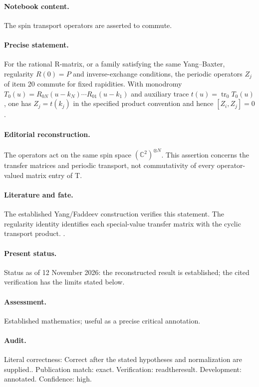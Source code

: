 \paragraph{Notebook content.} The spin transport operators are asserted to commute.

\paragraph{Precise statement.} For the rational R-matrix, or a family satisfying the same Yang--Baxter, regularity $R(0)=P$ and inverse-exchange conditions, the periodic operators $Z_j$ of item 20 commute for fixed rapidities. With monodromy $T_0(u)=R_{0N}(u-k_N)\cdots R_{01}(u-k_1)$ and auxiliary trace $t(u)=\operatorname{tr}_0T_0(u)$, one has $Z_j=t(k_j)$ in the specified product convention and hence $[Z_i,Z_j]=0$.

\paragraph{Editorial reconstruction.} The operators act on the same spin space $(\mathbb C^2)^{\otimes N}$. This assertion concerns the transfer matrices and periodic transport, not commutativity of every operator-valued matrix entry of T.

\paragraph{Literature and fate.} The established Yang/Faddeev construction verifies this statement. The regularity identity identifies each special-value transfer matrix with the cyclic transport product. \citep{yang1967manybody,faddeev1996bethe}.

\paragraph{Present status.} Status as of 12 November 2026: the reconstructed result is established; the cited verification has the limits stated below.

\paragraph{Assessment.} Established mathematics; useful as a precise critical annotation.

\paragraph{Audit.} Literal correctness: Correct after the stated hypotheses and normalization are supplied.. Publication match: exact. Verification: readtheresult. Development: annotated. Confidence: high.

